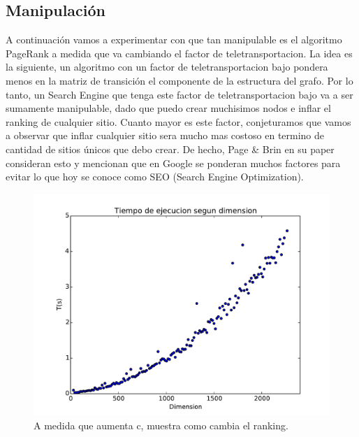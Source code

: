 \pagebreak
\subsection{Manipulación}

A continuación vamos a experimentar con que tan manipulable es el algoritmo PageRank a medida que va cambiando el factor de teletransportacion. La idea es la siguiente, un algoritmo con un factor de teletransportacion bajo pondera menos en la matriz de transición el componente de la estructura del grafo. Por lo tanto, un Search Engine que tenga este factor de teletransportacion bajo va a ser sumamente manipulable, dado que puedo crear muchisimos nodos e inflar el ranking de cualquier sitio. Cuanto mayor es este factor, conjeturamos que vamos a observar que inflar cualquier sitio sera mucho mas costoso en termino de cantidad de sitios únicos que debo crear. De hecho, Page \& Brin en su paper consideran esto y mencionan que en Google se ponderan muchos factores para evitar lo que hoy se conoce como SEO (Search Engine Optimization).

\begin{figure}[H]
\centering
\includegraphics[scale=0.7]{images/complejidad.pdf}
\caption{A medida que aumenta c, muestra como cambia el ranking.}
\label{timePageRank}
\end{figure}